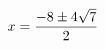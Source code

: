 \documentclass[preview]{standalone}
\begin{document}
\begin{align*}
\special{dvisvgm:raw <g id='unique000'>}x=\frac{-8\pm{4 \sqrt{7}}}{2}\special{dvisvgm:raw </g>}
\end{align*}
\end{document}
